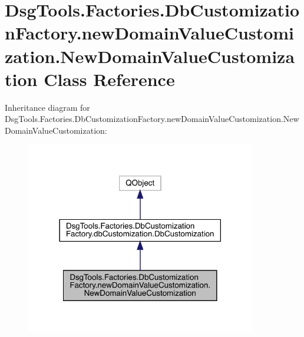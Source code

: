 \hypertarget{class_dsg_tools_1_1_factories_1_1_db_customization_factory_1_1new_domain_value_customization_1_1_new_domain_value_customization}{}\section{Dsg\+Tools.\+Factories.\+Db\+Customization\+Factory.\+new\+Domain\+Value\+Customization.\+New\+Domain\+Value\+Customization Class Reference}
\label{class_dsg_tools_1_1_factories_1_1_db_customization_factory_1_1new_domain_value_customization_1_1_new_domain_value_customization}


Inheritance diagram for Dsg\+Tools.\+Factories.\+Db\+Customization\+Factory.\+new\+Domain\+Value\+Customization.\+New\+Domain\+Value\+Customization\+:
\nopagebreak
\begin{figure}[H]
\begin{center}
\leavevmode
\includegraphics[width=285pt]{class_dsg_tools_1_1_factories_1_1_db_customization_factory_1_1new_domain_value_customization_1_1b92e0a4926982f45417c088ab47a5c0d}
\end{center}
\end{figure}


